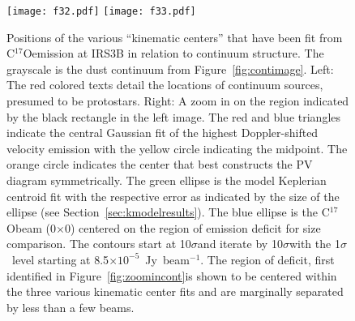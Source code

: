 \documentclass[twocolumn, 12pt]{aastex63}
\newcommand{\cso}{C$^{17}$O}
\newcommand{\csobeam}{0\farcs21$\times$0\farcs13}
\begin{document}
\begin{figure}[H]
\begin{center}
   \texttt{[image: f32.pdf]}
   \texttt{[image: f33.pdf]}
\end{center}
   \caption{Positions of the various ``kinematic centers'' that have been fit from \cso\space emission at IRS3B in relation to continuum structure. The grayscale is the dust continuum from Figure~\ref{fig:contimage}. Left: The red colored texts detail the locations of continuum sources, presumed to be protostars. Right: A zoom in on the region indicated by the black rectangle in the left image. The red and blue triangles indicate the central Gaussian fit of the highest Doppler-shifted velocity emission with the yellow circle indicating the midpoint. The orange circle indicates the center that best constructs the PV diagram symmetrically. The green ellipse is the model Keplerian centroid fit with the respective error as indicated by the size of the ellipse (see Section~\ref{sec:kmodelresults}). The blue ellipse is the \cso\space beam (\csobeam) centered on the region of emission deficit for size comparison. The contours start at 10$\sigma$\space and iterate by 10$\sigma$\space with the 1$\sigma$~level starting at 8.5$\times10^{-5}$~Jy~beam$^{-1}$. The region of deficit, first identified in Figure~\ref{fig:zoomincont}\space is shown to be centered within the three various kinematic center fits and are marginally separated by less than a few beams.}\label{fig:kincenter}
\end{figure}
\end{document}
